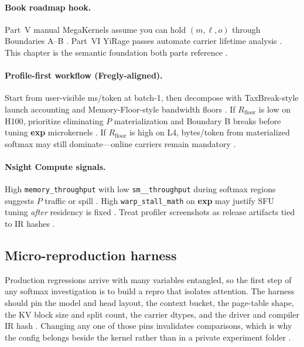 \paragraph{Book roadmap hook.} Part~V manual MegaKernels assume you can hold $(m,\ell,o)$ through Boundaries A--B \citep{taxbreak2026,chen2020compilerbasedhardw}. Part~VI YiRage passes automate carrier lifetime analysis \citep{yirage2026,amd2024aie}. This chapter is the semantic foundation both parts reference \citep{semianalysis2024tma,dao2023flashdecoding,patel2025llminference,dlbook,liu2024deepseekv3,memoryfloor2026,kwon2023vllm,nvidia2024cudagraphs}.


\paragraph{Profile-first workflow (Fregly-aligned).} Start from user-visible ms/token at batch-1, then decompose with TaxBreak-style launch accounting and Memory-Floor-style bandwidth floors \citep{taxbreak2026,memoryfloor2026}. If $R_{\mathrm{floor}}$ is low on H100, prioritize eliminating $P$ materialization and Boundary B breaks before tuning \textbf{exp} microkernels \citep{memoryfloor2026,patel2025llminference}. If $R_{\mathrm{floor}}$ is high on L4, bytes/token from materialized softmax may still dominate---online carriers remain mandatory \citep{memoryfloor2026,dao2022flashattention}.

\paragraph{Nsight Compute signals.} High \texttt{memory\_throughput} with low \texttt{sm\_\_throughput} during softmax regions suggests $P$ traffic or spill \citep{patel2025llminference,semianalysis2024tma}. High \texttt{warp\_stall\_math} on \textbf{exp} may justify SFU tuning \emph{after} residency is fixed \citep{nvidia2022hopper}. Treat profiler screenshots as release artifacts tied to IR hashes \citep{yirage2026,chen2020compilerbasedhardw}.

\subsection{Micro-reproduction harness}
\label{sec:ch10_micro_repro}

Production regressions arrive with many variables entangled, so the first step of any softmax investigation is to build a repro that isolates attention. The harness should pin the model and head layout, the context bucket, the page-table shape, the KV block size and split count, the carrier dtypes, and the driver and compiler IR hash \citep{patel2025llminference,taxbreak2026}. Changing any one of those pins invalidates comparisons, which is why the config belongs beside the kernel rather than in a private experiment folder \citep{yirage2026,memoryfloor2026}.


